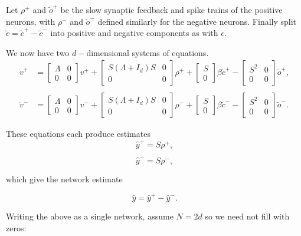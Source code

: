 \begin{enumerate}
Let $\rho^+$ and $\tilde{o}^+$ be the slow synaptic feedback and spike trains of the positive neurons, with $\rho^-$ and $\tilde{o}^-$ defined similarly for the negative neurons. Finally split $\tilde{c} = \tilde{c}^+ - \tilde{c}^-$ into positive and negative components as with $\epsilon$.  

 We now have two $d-$dimensional systems of equations.  
\begin{align*}
\dot{v}^{+}
&= 
\begin{bmatrix}
\Lambda & 0
\\
0 & 0
\end{bmatrix}
v^+ +
\begin{bmatrix}
S \left(\Lambda + I_d \right) S & 0
\\
0 & 0
\end{bmatrix}
  \rho^+
  +
\begin{bmatrix}
S \\ 0
\end{bmatrix}  
\beta \tilde{c}^+
  - 
 \begin{bmatrix}
S^2 & 0
\\
0 & 0
\end{bmatrix}
    \tilde{o}^+,
    \\
    \\
    \dot{v}^{-}
&= 
\begin{bmatrix}
\Lambda & 0
\\
0 & 0
\end{bmatrix}
v^- +
\begin{bmatrix}
S \left(\Lambda + I_d \right) S & 0
\\
0 & 0
\end{bmatrix}
  \rho^-
  +
\begin{bmatrix}
S \\ 0
\end{bmatrix}  
\beta \tilde{c}^-
  - 
 \begin{bmatrix}
S^2 & 0
\\
0 & 0
\end{bmatrix}
    \tilde{o}^-.
\end{align*}


These equations each produce estimates 
$$
\hat{y}^+ = S \rho^+,
$$

$$
\hat{y}^- = S \rho^-,
$$

which give the network estimate

$$
\hat{y} = \hat{y}^+ - \hat{y}^-.
$$



Writing the above as a single network, assume $N = 2d$ so we need not fill with zeros:


\end{enumerate}
